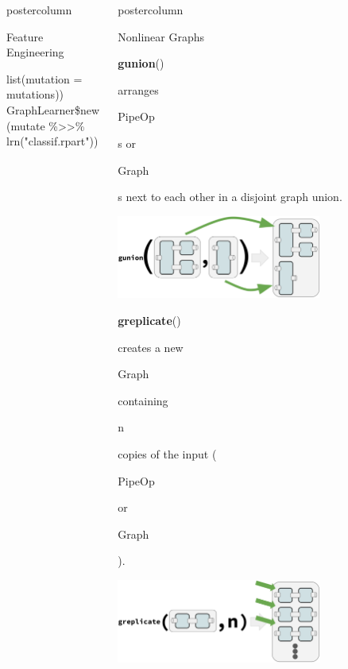 \documentclass{beamer}
\newlength{\columnheight} %
\newcommand{\codeinline}[1]{\begin{codeboxinline}#1\end{codeboxinline}}
\begin{document}
\begin{frame}[fragile]{}
\begin{columns}
\begin{column}{.245\textwidth}
\begin{beamercolorbox}[center]{postercolumn}
\begin{minipage}{.98\textwidth}
{\begin{myblock}{Feature Engineering}
\begin{codeboxexample}
{              \hspace*{1ex} list(mutation = mutations))\\
              GraphLearner\$new(mutate \%>{}>\% lrn("classif.rpart"))
            }
            \end{codeboxexample}
            \end{myblock}
              \vspace{-1.0em}
       			\vfill}
				\end{minipage}
			\end{beamercolorbox}
		\end{column}
    \begin{column}{.245\textwidth}
			\begin{beamercolorbox}[center]{postercolumn}
				\begin{minipage}{.98\textwidth}
					\parbox[t][\columnheight]{\textwidth}{
            \begin{myblock}{Nonlinear Graphs}
              \vspace{-0.5em}
              \codeinline{\textbf{gunion}()} arranges \codeinline{PipeOp}s or \codeinline{Graph}s next to each other in a disjoint graph union.
              \begin{center}
                \includegraphics[width=0.7\textwidth]{img/gunion.pdf}
              \end{center}
              \vspace{0.3em}
              \codeinline{\textbf{greplicate}()} creates a new \codeinline{Graph} containing \codeinline{n} copies of the input (\codeinline{PipeOp} or \codeinline{Graph}).
              \begin{center}
                \includegraphics[width=0.7\textwidth]{img/greplicate.pdf}

\end{center}
\end{myblock}}
\end{minipage}
\end{beamercolorbox}
\end{column}
\end{columns}
\end{frame}
\end{document}
